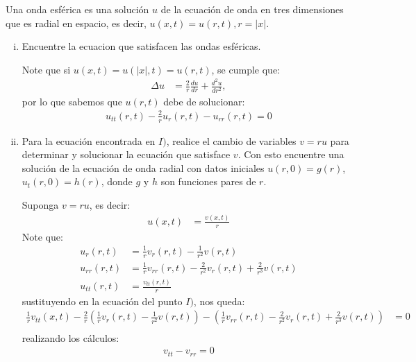 \begin{homeworkProblem}
  Una onda esférica es una solución $u$ de la ecuación de onda en tres dimensiones que es radial en espacio, es decir, $u(x,t) = u(r,t), r=|x|$.
  \begin{enumerate}[i)]
    \item Encuentre la ecuacion que satisfacen las ondas esféricas.
      \begin{solucion}
        Note que si $u(x,t)=u(|x|,t)=u(r,t)$, se cumple que:
        \begin{align*}
          \Delta u&=\frac{2}{r} \frac{du}{dr} + \frac{d^2 u}{dr^2},
        \end{align*}
        por lo que sabemos que $u(r,t)$ debe de solucionar:
        \begin{align*}
          u_{tt}(r,t)-\frac{2}{r} u_r(r,t) - u_{rr}(r,t)=0
        \end{align*}
        \demostrado
      \end{solucion}
    \item Para la ecuación encontrada en $I)$, realice el cambio de variables $v = ru$  para determinar y solucionar la ecuación que satisface $v$. Con esto encuentre una solución de la ecuación de onda radial con datos iniciales $u(r,0) = g(r)$, $u_t(r,0) = h(r)$, donde $g$ y $h$ son funciones pares de $r$.
      \begin{solucion}
        Suponga $v=ru$, es decir:
        \begin{align*}
          u(x,t)&=\frac{v(x,t)}{r}
        \end{align*}
        Note que:
        \begin{align*}
          u_r(r,t) &= \frac{1}{r} v_r(r,t) - \frac{1}{r^2}v(r,t)\\
          u_{rr}(r,t) &= \frac{1}{r} v_{rr}(r,t) - \frac{2}{r^2} v_r(r,t) + \frac{2}{r^3}v(r,t)\\
          u_{tt}(r,t)&=\frac{v_{tt}(r,t)}{r}
        \end{align*}
        sustituyendo en la ecuación del punto $I)$, nos queda:
        \begin{align*}
          \frac{1}{r}v_{tt}(x,t)-\frac{2}{r}\left( \frac{1}{r} v_r(r,t) - \frac{1}{r^2}v(r,t) \right)-\left( \frac{1}{r} v_{rr}(r,t) - \frac{2}{r^2} v_r(r,t) + \frac{2}{r^3}v(r,t) \right)&=0\\
        \end{align*}
        realizando los cálculos:
        \begin{align*}
          v_{tt}-v_{rr}=0

\end{align*}
\end{solucion}
\end{enumerate}
\end{homeworkProblem}
